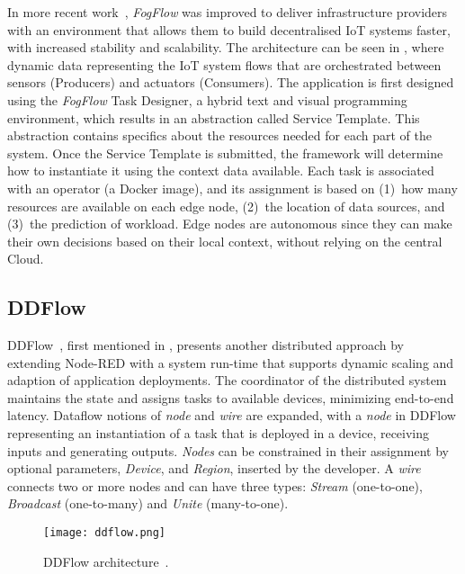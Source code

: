 In more recent work~\cite{fog_flow_tool}, \textit{FogFlow} was improved to deliver infrastructure providers with an environment that allows them to build decentralised IoT systems faster, with increased stability and scalability. The architecture can be seen in , where dynamic data representing the IoT system flows that are orchestrated between sensors (Producers) and actuators (Consumers). The application is first designed using the \textit{FogFlow} Task Designer, a hybrid text and visual programming environment, which results in an abstraction called Service Template. This abstraction contains specifics about the resources needed for each part of the system. Once the Service Template is submitted, the framework will determine how to instantiate it using the context data available. Each task is associated with an operator (a Docker image), and its assignment is based on (1)~how many resources are available on each edge node, (2)~the location of data sources, and (3)~the prediction of workload. Edge nodes are autonomous since they can make their own decisions based on their local context, without relying on the central Cloud.

\subsection{DDFlow}\label{sec:decentralized_sota_ddflow}

DDFlow~\cite{ddflow}, first mentioned in , presents another distributed approach by extending Node-RED with a system run-time that supports dynamic scaling and adaption of application deployments. The coordinator of the distributed system maintains the state and assigns tasks to available devices, minimizing end-to-end latency. Dataflow notions of \textit{node} and \textit{wire} are expanded, with a \textit{node} in DDFlow representing an instantiation of a task that is deployed in a device, receiving inputs and generating outputs. \textit{Nodes} can be constrained in their assignment by optional parameters, \textit{Device}, and \textit{Region}, inserted by the developer. A \textit{wire} connects two or more nodes and can have three types: \textit{Stream} (one-to-one), \textit{Broadcast} (one-to-many) and \textit{Unite} (many-to-one). 

\begin{figure}[h]
\centering
\texttt{[image: ddflow.png]}
\caption[DDFlow architecture]{DDFlow architecture~\cite{ddflow}.}\label{fig:ddflow}
\end{figure}

